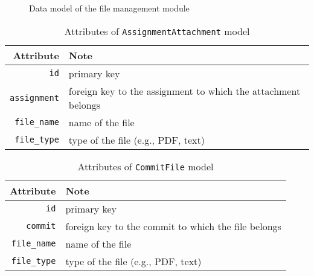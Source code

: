 \begin{itemize}
\begin{figure}[ht]

    \caption{Data model of the file management module}
    \label{fig:FILES_ER}
\end{figure}

\begin{table}[ht]
    \centering
    \caption{Attributes of \texttt{AssignmentAttachment} model}
    \label{tab:ATTACH_FILE_ATTR}
    \renewcommand{\arraystretch}{1.3}
    \begin{tabular}[ht]{r|l}
        \hline
        Attribute & Note \\
        \hline
        \hline
        \texttt{id} & primary key \\
        \hline
        \texttt{assignment} & foreign key to the assignment to which the
            attachment belongs \\
        \hline
        \texttt{file\_name} & name of the file\\
        \hline
        \texttt{file\_type} & type of the file (e.g., PDF, text) \\
        \hline
    \end{tabular}
\end{table}

\begin{table}[ht]
    \centering
    \caption{Attributes of \texttt{CommitFile} model}
    \label{tab:COMMIT_FILE_ATTR}
    \renewcommand{\arraystretch}{1.3}
    \begin{tabular}[ht]{r|l}
        \hline
        Attribute & Note \\
        \hline
        \hline
        \texttt{id} & primary key \\
        \hline
        \texttt{commit} & foreign key to the commit to which the file belongs \\
        \hline
        \texttt{file\_name} & name of the file \\
        \hline
        \texttt{file\_type} & type of the file (e.g., PDF, text) \\
        \hline
    \end{tabular}
\end{table}


\end{itemize}
